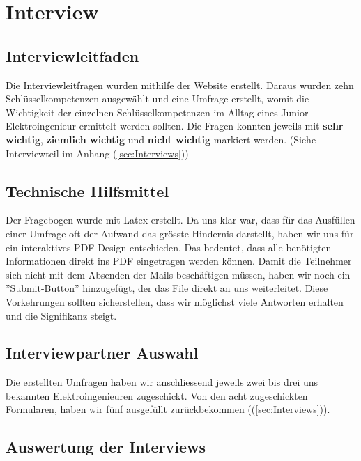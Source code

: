 
\chapter{Interview}


\section{Interviewleitfaden}

Die Interviewleitfragen wurden mithilfe der Website \cite{Schluesselqualifikationen} erstellt. Daraus wurden zehn Schlüsselkompetenzen ausgewählt und eine Umfrage erstellt, womit die Wichtigkeit der einzelnen Schlüsselkompetenzen im Alltag eines Junior Elektroingenieur ermittelt werden sollten. Die Fragen konnten jeweils mit \textbf{sehr wichtig}, \textbf{ziemlich wichtig} und \textbf{nicht wichtig} markiert werden. (Siehe Interviewteil im Anhang (\ref{sec:Interviews}))  

\section {Technische Hilfsmittel}

Der Fragebogen wurde mit Latex erstellt. Da uns klar war, dass für das Ausfüllen einer Umfrage oft der Aufwand das grösste Hindernis darstellt, haben wir uns für ein interaktives PDF-Design entschieden. Das bedeutet, dass alle benötigten Informationen direkt ins PDF eingetragen werden können. Damit die Teilnehmer sich nicht mit dem Absenden der Mails beschäftigen müssen, haben wir noch ein ''Submit-Button'' hinzugefügt, der das File direkt an uns weiterleitet. Diese Vorkehrungen sollten sicherstellen, dass wir möglichst viele Antworten erhalten und die Signifikanz steigt. 


\section{Interviewpartner Auswahl}

Die erstellten Umfragen haben wir anschliessend jeweils zwei bis drei uns bekannten Elektroingenieuren zugeschickt. Von den acht zugeschickten Formularen, haben wir fünf ausgefüllt zurückbekommen ((\ref{sec:Interviews})). 

\section{Auswertung der Interviews}

